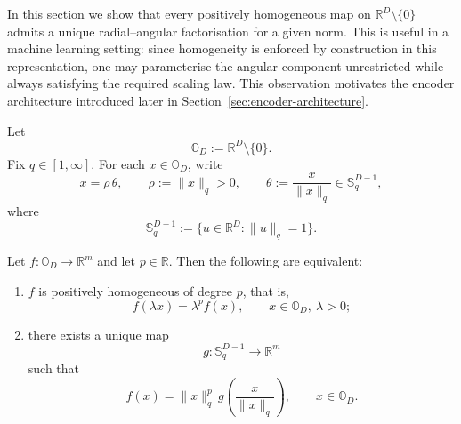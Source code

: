 In this section we show that every positively homogeneous map on
\(\mathbb{R}^D\setminus\{0\}\) admits a unique radial--angular factorisation
for a given norm. This is useful in a machine learning setting: since homogeneity is enforced by construction in this representation, one may parameterise the angular component unrestricted while always satisfying the required scaling law. This observation motivates the encoder architecture introduced later in
Section~\ref{sec:encoder-architecture}.

Let
\[
\mathbb{O}_D := \mathbb{R}^D \setminus \{0\}.
\]
Fix \(q \in [1,\infty]\). For each \(x \in \mathbb{O}_D\), write
\[
x = \rho\,\theta,
\qquad
\rho := \|x\|_{q} > 0,
\qquad
\theta := \frac{x}{\|x\|_{q}} \in \mathbb{S}^{D-1}_{q},
\]
where
\[
\mathbb{S}^{D-1}_{q} := \{u \in \mathbb{R}^D : \|u\|_{q} = 1\}.
\]

\begin{proposition}
\label{prop:canonical-homogeneous-form}
Let \(f : \mathbb{O}_D \to \mathbb{R}^m\) and let \(p \in \mathbb{R}\). Then the
following are equivalent:
\begin{enumerate}
    \item \(f\) is positively homogeneous of degree \(p\), that is,
    \[
    f(\lambda x) = \lambda^p f(x),
    \qquad x \in \mathbb{O}_D,\ \lambda > 0;
    \]
    \item there exists a unique map
    \[
    g : \mathbb{S}^{D-1}_{q} \to \mathbb{R}^m
    \]
    such that
    \[
    f(x) = \|x\|_{q}^p\, g\!\left(\frac{x}{\|x\|_{q}}\right),
    \qquad x \in \mathbb{O}_D.
    \]
\end{enumerate}
\end{proposition}

